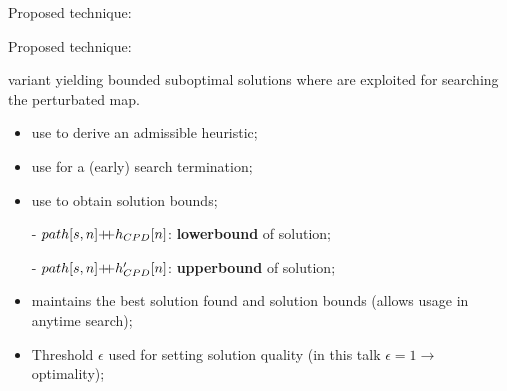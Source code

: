 \begin{frame}{Proposed technique: \CPDSearch{}}
\begin{minipage}{0.35\textwidth}
    \end{minipage}

\end{frame}

\begin{frame}{Proposed technique: \CPDSearch{}}
    \begin{block}{\CPDSearch{}}
        \A{} variant yielding bounded suboptimal solutions where \CPDPathsName{} are exploited for searching the perturbated map.
    \end{block}

    \begin{itemize}
        \item {\color{gray}use \CPD{} to derive an admissible heuristic;}
        \item {\color{gray}use \CPD{} for a (early) search termination;}
        \item {use \CPD{} to obtain solution bounds;}
    \end{itemize}

    \begin{itemize}
        \item[-] $\pathOnGraph{s}{n} \doublePlus{} \CPDPathCostOriginal{n}{t}$: \textbf{lowerbound} of solution;
        \item[-] $\pathOnGraph{s}{n} \doublePlus{} \CPDPathCostNew{n}{t}$: \textbf{upperbound} of solution;
    \end{itemize}

    \begin{block}{}
        \begin{itemize}
            \item \CPDSearch{} maintains the best solution found and solution bounds (allows usage in anytime search);
            \item Threshold $\epsilon$ used for setting \CPDSearch{} solution quality (in this talk $\epsilon = 1 \rightarrow $ optimality);
        \end{itemize}
    \end{block}

\end{frame}

